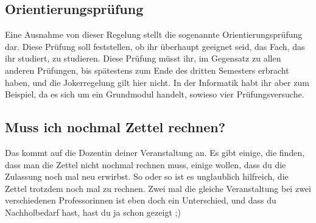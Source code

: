 \subsection{Orientierungsprüfung}
Eine Ausnahme von dieser Regelung stellt die sogenannte Orientierungsprüfung dar. Diese Prüfung soll feststellen, ob ihr überhaupt geeignet seid, das Fach, das ihr studiert, zu studieren. Diese Prüfung müsst ihr, im Gegensatz zu allen anderen Prüfungen, bis spätestens zum Ende des dritten Semesters erbracht haben, und die Jokerregelung gilt hier nicht. In der Informatik habt ihr aber zum Beispiel, da es sich um ein Grundmodul handelt, sowieso vier Prüfungsversuche.

\subsection{Muss ich nochmal Zettel rechnen?}
Das kommt auf die Dozentin deiner Veranstaltung an. Es gibt einige, die finden, dass man die Zettel nicht nochmal rechnen muss, einige wollen, dass du die Zulassung noch mal neu erwirbst. So oder so ist es unglaublich hilfreich, die Zettel trotzdem noch mal zu rechnen. Zwei mal die gleiche Veranstaltung bei zwei verschiedenen Professorinnen ist eben doch ein Unterschied, und dass du Nachholbedarf hast, hast du ja schon gezeigt ;)
